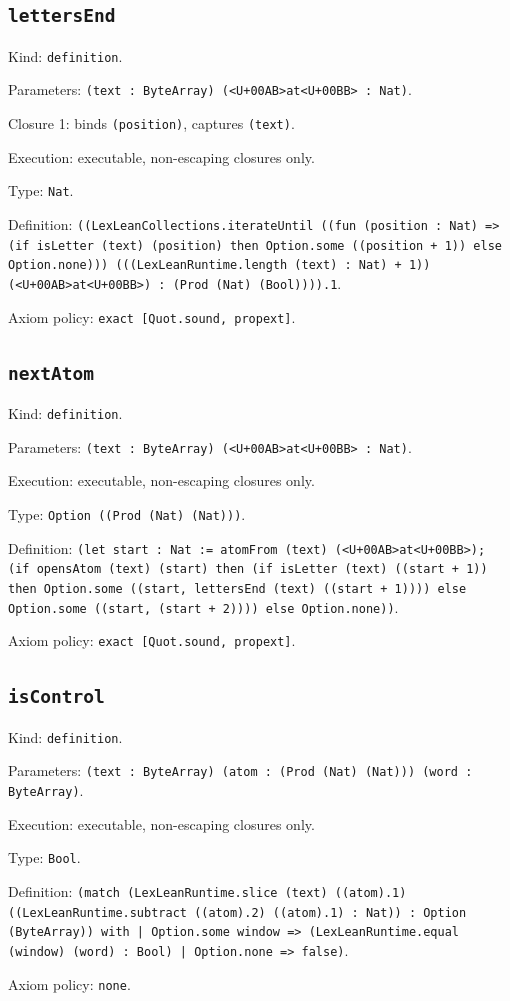 \documentclass[11pt]{article}
\begin{document}
\subsection*{\texttt{lettersEnd}}
\noindent Kind: \texttt{definition}.\par
\noindent Parameters: \texttt{(text : ByteArray) (<U+00AB>at<U+00BB> : Nat)}.\par
\noindent Closure 1: binds \texttt{(position)}, captures \texttt{(text)}.\par
\noindent Execution: executable, non-escaping closures only.\par
\noindent Type: \texttt{Nat}.\par
\noindent Definition: \texttt{((LexLeanCollections.iterateUntil ((fun (position : Nat) => (if isLetter (text) (position) then Option.some ((position + 1)) else Option.none))) (((LexLeanRuntime.length (text) : Nat) + 1)) (<U+00AB>at<U+00BB>) : (Prod (Nat) (Bool)))).1}.\par
\noindent Axiom policy: \texttt{exact [Quot.sound, propext]}.\par
\subsection*{\texttt{nextAtom}}
\noindent Kind: \texttt{definition}.\par
\noindent Parameters: \texttt{(text : ByteArray) (<U+00AB>at<U+00BB> : Nat)}.\par
\noindent Execution: executable, non-escaping closures only.\par
\noindent Type: \texttt{Option ((Prod (Nat) (Nat)))}.\par
\noindent Definition: \texttt{(let start : Nat := atomFrom (text) (<U+00AB>at<U+00BB>); (if opensAtom (text) (start) then (if isLetter (text) ((start + 1)) then Option.some ((start, lettersEnd (text) ((start + 1)))) else Option.some ((start, (start + 2)))) else Option.none))}.\par
\noindent Axiom policy: \texttt{exact [Quot.sound, propext]}.\par
\subsection*{\texttt{isControl}}
\noindent Kind: \texttt{definition}.\par
\noindent Parameters: \texttt{(text : ByteArray) (atom : (Prod (Nat) (Nat))) (word : ByteArray)}.\par
\noindent Execution: executable, non-escaping closures only.\par
\noindent Type: \texttt{Bool}.\par
\noindent Definition: \texttt{(match (LexLeanRuntime.slice (text) ((atom).1) ((LexLeanRuntime.subtract ((atom).2) ((atom).1) : Nat)) : Option (ByteArray)) with | Option.some window => (LexLeanRuntime.equal (window) (word) : Bool) | Option.none => false)}.\par
\noindent Axiom policy: \texttt{none}.\par
\end{document}
